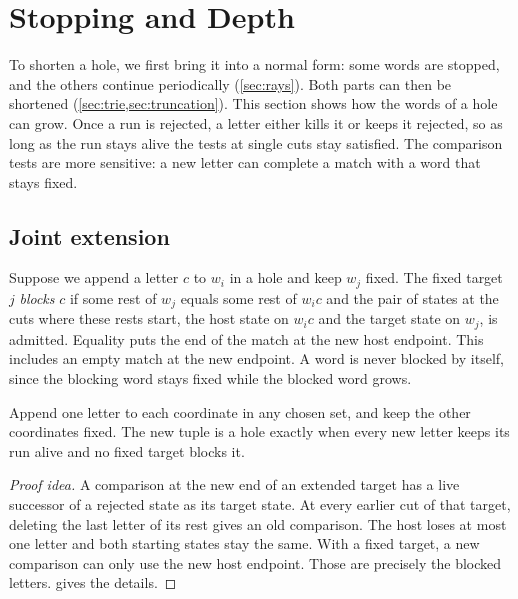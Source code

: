 \section{Stopping and Depth}
\label{sec:stopping}

To shorten a hole, we first bring it into a normal form: some words are
stopped, and the others continue periodically (\cref{sec:rays}). Both parts
can then be shortened (\cref{sec:trie,sec:truncation}). This section shows
how the words of a hole can grow. Once a run is rejected, a letter either
kills it or keeps it rejected, so as long as the run stays alive the tests
at single cuts stay satisfied. The comparison tests are more sensitive: a
new letter can complete a match with a word that stays fixed.

\subsection{Joint extension}

Suppose we append a letter $c$ to $w_i$ in a hole and keep $w_j$ fixed.
The fixed target $j$ \emph{blocks} $c$ if some rest of $w_j$ equals some
rest of $w_ic$ and the pair of states at the cuts where these rests start,
the host state on $w_ic$ and the target state on $w_j$, is admitted.
Equality puts the end of the match at the new host endpoint. This includes
an empty match at the new endpoint. A word is never blocked by itself,
since the blocking word stays fixed while the blocked word grows.

\begin{lemma}\label{lem:joint}
Append one letter to each coordinate in any chosen set, and keep the
other coordinates fixed. The new tuple is a hole exactly when every new
letter keeps its run alive and no fixed target blocks it.
\end{lemma}

\begin{proof}[Proof idea]
A comparison at the new end of an extended target has a live successor
of a rejected state as its target state. At every earlier cut of that
target, deleting the last letter of its rest gives an old comparison.
The host loses at most one letter and both starting states stay the same.
With a fixed target, a new comparison can only use the new host endpoint.
Those are precisely the blocked letters.  gives the
details.
\end{proof}



